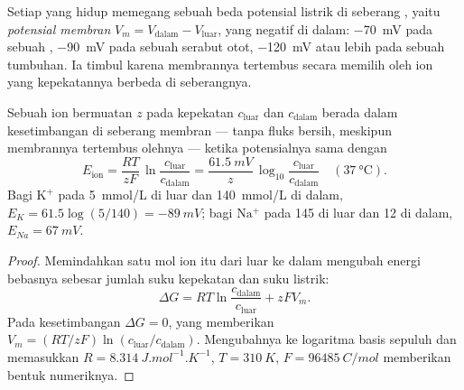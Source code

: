 \begin{definition}\label{def:b1:membranes-transport:potential}
Setiap  yang hidup memegang sebuah beda potensial listrik di seberang
, yaitu \emph{potensial membran}
$V_m = V_{\text{dalam}} - V_{\text{luar}}$, yang negatif di
dalam: \qty{-70}{mV} pada sebuah , \qty{-90}{mV} pada sebuah
serabut otot, \qty{-120}{mV} atau lebih pada sebuah  tumbuhan. Ia
timbul karena membrannya tertembus secara memilih oleh ion yang
kepekatannya berbeda di seberangnya.
\end{definition}

\begin{theorem}\label{thm:b1:membranes-transport:nernst}
Sebuah ion bermuatan $z$ pada kepekatan $c_{\text{luar}}$ dan
$c_{\text{dalam}}$ berada dalam kesetimbangan di seberang membran ---
tanpa fluks bersih, meskipun membrannya tertembus olehnya --- ketika
potensialnya sama dengan \emph{}
\[
E_{\text{ion}} = \frac{RT}{zF}\,\ln\frac{c_{\text{luar}}}{c_{\text{dalam}}}
= \frac{\qty{61.5}{mV}}{z}\,\log_{10}\frac{c_{\text{luar}}}{c_{\text{dalam}}}
\quad (\qty{37}{\celsius}).
\]
Bagi $\mathrm{K^+}$ pada \qty{5}{mmol/L} di luar dan \qty{140}{mmol/L}
di dalam, $E_K = 61.5\log(5/140) = \qty{-89}{mV}$; bagi $\mathrm{Na^+}$
pada \qty{145}{} di luar dan \qty{12}{} di dalam, $E_{Na} = \qty{+67}{mV}$.
\end{theorem}
\begin{proof}
Memindahkan satu mol ion itu dari luar ke dalam mengubah energi bebasnya
sebesar jumlah suku kepekatan dan suku listrik:
\[
\Delta G = RT\ln\frac{c_{\text{dalam}}}{c_{\text{luar}}} + zFV_m .
\]
Pada kesetimbangan $\Delta G = 0$, yang memberikan $V_m = (RT/zF)\ln(c_{\text{luar}}/c_{\text{dalam}})$.
Mengubahnya ke logaritma basis sepuluh dan memasukkan $R = \qty{8.314}{J.mol^{-1}.K^{-1}}$,
$T = \qty{310}{K}$, $F = \qty{96485}{C/mol}$ memberikan bentuk numeriknya.
\end{proof}

